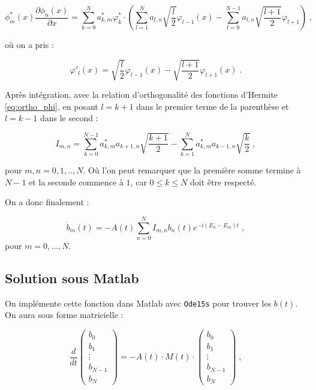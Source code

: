\documentclass{report}
\begin{document}
\begin{equation}
\phi_{m}^{\ast}(x)\frac{\partial \phi_{n}(x)}{\partial x} = \sum_{k=0}^{N} a_{k,m}^{\ast}\varphi_{k}^{\ast} \cdot \left(\sum_{l=1}^{N}a_{l,n} \sqrt{\frac{l}{2}}\varphi_{l-1}(x)-\sum_{l=0}^{N-1}a_{l,n}\sqrt{\frac{l+1}{2}}\varphi_{l+1} \right)\;,
\end{equation}

où on a pris :

\begin{equation}
\varphi'_{l}(x) =  \sqrt{\frac{l}{2}} \varphi_{l-1}(x)-\sqrt{\frac{l+1}{2}}\varphi_{l+1}(x)\;.
\end{equation}

Après intégration, avec la relation d'orthogonalité des fonctions d'Hermite \eqref{eq:ortho_phi}, en posant $l=k+1$ dans le premier terme de la parenthèse et $l=k-1$ dans le second :

\begin{equation}
I_{m,n} = \sum_{k=0}^{N-1} a_{k,m}^{\ast}  a_{k+1,n} \sqrt{\frac{k+1}{2}}- \sum_{k=1}^{N} a_{k,m}^{\ast}a_{k-1,n}\sqrt{\frac{k}{2}}\;,
\end{equation}

pour $m,n = 0,1,..,N$. Où l'on peut remarquer que la première somme termine à $N-1$ et la seconde commence à $1$, car $0 \leq k \leq N$ doit être respecté.

On a donc finalement :

\begin{equation}
\dot{b}_{m}(t) = - A(t) \sum_{n=0}^{N}I_{m,n}b_{n}(t) e^{-i(E_{n}-E_{m})t}\;,
\end{equation}
pour $m=0,...,N$.

\subsection{Solution sous Matlab}

On implémente cette fonction dans Matlab avec \texttt{Ode15s} pour trouver les $b(t)$. On aura sous forme matricielle :

\begin{equation}
\frac{d}{dt}
\begin{pmatrix}
 b_{0}\\ 
 b_{1}\\ 
 \vdots\\ 
 b_{N-1}\\ 
  b_{N}
\end{pmatrix} = -A(t) \cdot M(t) \cdot 
\begin{pmatrix}
 b_{0}\\ 
 b_{1}\\ 
 \vdots\\ 
 b_{N-1}\\ 
  b_{N}
\end{pmatrix}\;,
\end{equation}
\end{document}
